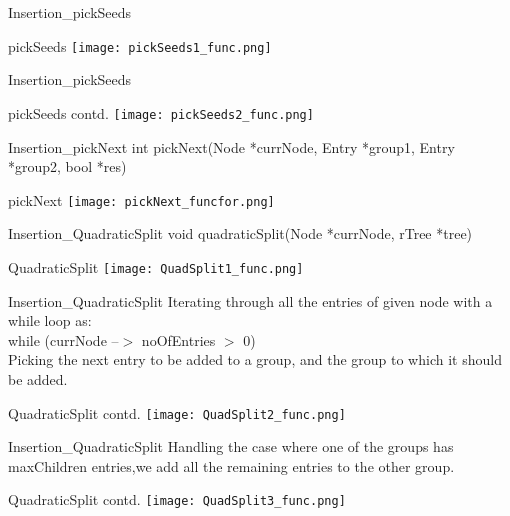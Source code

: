 \documentclass{beamer}
\begin{document}
\begin{frame}{Insertion_{pickSeeds}}
    \begin{block}{pickSeeds}
       \texttt{[image: pickSeeds1\_func.png]}
    \end{block}
\end{frame}
\begin{frame}{Insertion_{pickSeeds}}
    \begin{block}{pickSeeds contd.}
       \texttt{[image: pickSeeds2\_func.png]}
    \end{block}
\end{frame}
\begin{frame}{Insertion_{pickNext}}
int pickNext(Node *currNode, Entry *group1, Entry *group2, bool *res)
    \begin{block}{pickNext}
       \texttt{[image: pickNext\_funcfor.png]}
    \end{block}
\end{frame}
\begin{frame}{Insertion_{QuadraticSplit}}
void quadraticSplit(Node *currNode, rTree *tree)
    \begin{block}{QuadraticSplit}
       \texttt{[image: QuadSplit1\_func.png]}
    \end{block}
\end{frame}
\begin{frame}{Insertion_{QuadraticSplit}}
Iterating through all the entries of given node with a while loop as:\\
while (currNode --$>$ noOfEntries $>$ 0)\\
Picking the next entry to be added to a group, and the group to which it should be added.
    \begin{block}{QuadraticSplit contd.}
       \texttt{[image: QuadSplit2\_func.png]}
    \end{block}
\end{frame}
\begin{frame}{Insertion_{QuadraticSplit}}
Handling the case where one of the groups has maxChildren entries,we add all the remaining entries to the other group.
    \begin{block}{QuadraticSplit contd.}
       \texttt{[image: QuadSplit3\_func.png]}
    \end{block}
\end{frame}
\end{document}
